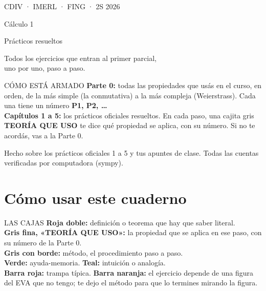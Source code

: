 \thispagestyle{empty}
\vspace*{18mm}
{\ttfamily\small\color{suave} CDIV · IMERL · FING · 2S 2026}\par\vspace{3mm}
{\plexbold\fontsize{26}{30}\selectfont Cálculo 1}\par\vspace{1mm}
{\plexbold\fontsize{17}{21}\selectfont\color{rojo} Prácticos resueltos}\par\vspace{4mm}
{\large Todos los ejercicios que entran al primer parcial,\\ uno por uno, paso a paso.}\par\vspace{10mm}
\begin{sello}{CÓMO ESTÁ ARMADO}
\textbf{Parte 0:} todas las propiedades que usás en el curso, en orden, de la más simple (la conmutativa) a la más compleja (Weierstrass). Cada una tiene un número \textbf{P1, P2, \dots}\\[3pt]
\textbf{Capítulos 1 a 5:} los prácticos oficiales resueltos. En cada paso, una cajita gris \textbf{TEORÍA QUE USO} te dice qué propiedad se aplica, con su número. Si no te acordás, vas a la Parte 0.
\end{sello}
\vfill
{\ttfamily\scriptsize\color{suave} Hecho sobre los prácticos oficiales 1 a 5 y tus apuntes de clase. Todas las cuentas verificadas por computadora (sympy).}
\newpage

{\hypersetup{linkcolor=tinta}\renewcommand{\contentsname}{Índice}\tableofcontents}
\newpage

\chapter*{Cómo usar este cuaderno}

\begin{memo}{LAS CAJAS}
\textbf{\color{rojo}Roja doble:} definición o teorema que hay que saber literal.\\
\textbf{\color{acero}Gris fina, «TEORÍA QUE USO»:} la propiedad que se aplica en ese paso, con su número de la Parte 0.\\
\textbf{\color{acero}Gris con borde:} método, el procedimiento paso a paso.\\
\textbf{\color{verde}Verde:} ayuda-memoria. \textbf{\color{teal}Teal:} intuición o analogía.\\
\textbf{\color{rojo}Barra roja:} trampa típica. \textbf{\color{naranja}Barra naranja:} el ejercicio depende de una figura del EVA que no tengo; te dejo el método para que lo termines mirando la figura.
\end{memo}

